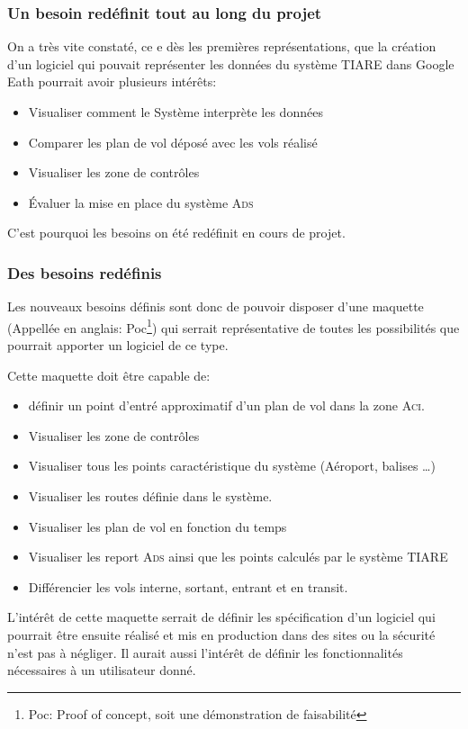         \subsubsection{Un besoin redéfinit tout au long du projet}
On a très vite constaté, ce e dès les premières représentations,  que la création d'un logiciel qui pouvait représenter les données du système TIARE dans Google Eath pourrait avoir plusieurs intérêts:
\begin{itemize}
\item Visualiser comment le Système interprète les données
\item Comparer les plan de vol déposé avec les vols réalisé
\item Visualiser les zone de contrôles
\item Évaluer la mise en place du système \textsc{Ads}
\end{itemize}
C'est pourquoi les besoins on été redéfinit en cours de projet.

        \subsubsection{Des besoins redéfinis}
Les nouveaux besoins définis sont donc de pouvoir disposer d'une maquette (Appellée en anglais: Poc\footnote{Poc: Proof of concept, soit une démonstration de faisabilité}) qui serrait représentative de toutes les possibilités que pourrait apporter un logiciel de ce type.

Cette maquette doit être capable de:
\begin{itemize}
\item définir un point d'entré approximatif d'un plan de vol dans la zone \textsc{Aci}.
\item Visualiser les zone de contrôles
\item Visualiser tous les points caractéristique du système (Aéroport, balises …)
\item Visualiser les routes définie dans le système.
\item Visualiser les plan de vol en fonction du temps
\item Visualiser les report \textsc{Ads} ainsi que les points calculés par le système TIARE
\item Différencier les vols interne, sortant, entrant et en transit.
\end{itemize}

L’intérêt de cette maquette serrait de définir les spécification d'un logiciel qui pourrait être ensuite réalisé et mis en production dans des sites ou la sécurité n'est pas à négliger. Il aurait aussi l’intérêt de définir les fonctionnalités nécessaires à un utilisateur donné.

